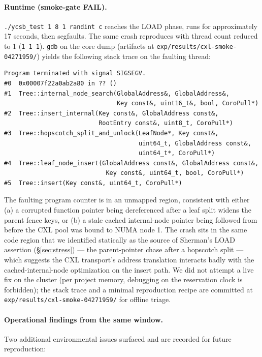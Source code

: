 \documentclass[11pt,a4paper]{article}
\begin{document}
\paragraph{Runtime (smoke-gate FAIL).} \texttt{./ycsb\_test 1 8 1 randint c} reaches the LOAD phase, runs for approximately 17 seconds, then segfaults. The same crash reproduces with thread count reduced to 1 (\texttt{1 1 1}). \texttt{gdb} on the core dump (artifacts at \texttt{exp/results/cxl-smoke-04271959/}) yields the following stack trace on the faulting thread:

\begin{lstlisting}[basicstyle=\ttfamily\scriptsize]
Program terminated with signal SIGSEGV.
#0  0x00007f22a0ab2a80 in ?? ()
#1  Tree::internal_node_search(GlobalAddress&, GlobalAddress&,
                               Key const&, uint16_t&, bool, CoroPull*)
#2  Tree::insert_internal(Key const&, GlobalAddress const&,
                          RootEntry const&, uint8_t, CoroPull*)
#3  Tree::hopscotch_split_and_unlock(LeafNode*, Key const&,
                                     uint64_t, GlobalAddress const&,
                                     uint64_t*, CoroPull*)
#4  Tree::leaf_node_insert(GlobalAddress const&, GlobalAddress const&,
                            Key const&, uint64_t, bool, CoroPull*)
#5  Tree::insert(Key const&, uint64_t, CoroPull*)
\end{lstlisting}

The faulting program counter is in an unmapped region, consistent with either (a) a corrupted function pointer being dereferenced after a leaf split widens the parent fence keys, or (b) a stale cached internal-node pointer being followed from before the CXL pool was bound to NUMA node 1. The crash sits in the same code region that we identified statically as the source of Sherman's LOAD assertion (\S\ref{sec:stress}) --- the parent-pointer chase after a hopscotch split --- which suggests the CXL transport's address translation interacts badly with the cached-internal-node optimization on the insert path. We did not attempt a live fix on the cluster (per project memory, debugging on the reservation clock is forbidden); the stack trace and a minimal reproduction recipe are committed at \texttt{exp/results/cxl-smoke-04271959/} for offline triage.

\paragraph{Operational findings from the same window.} Two additional environmental issues surfaced and are recorded for future reproduction:
\end{document}
